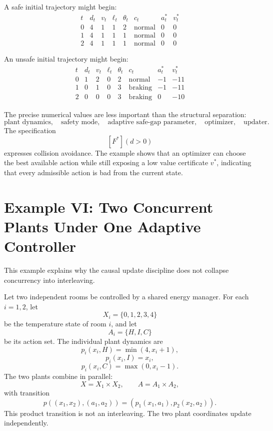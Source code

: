 A safe initial trajectory might begin:
\[
\begin{array}{c|c|c|c|c|c|c|c}
t & d_t & v_t & \ell_t & \theta_t & c_t & a_t^* & v_t^* \\
\hline
0 & 4 & 1 & 1 & 2 & \operatorname{normal} & 0 & 0 \\
1 & 4 & 1 & 1 & 1 & \operatorname{normal} & 0 & 0 \\
2 & 4 & 1 & 1 & 1 & \operatorname{normal} & 0 & 0
\end{array}
\]

An unsafe initial trajectory might begin:
\[
\begin{array}{c|c|c|c|c|c|c|c}
t & d_t & v_t & \ell_t & \theta_t & c_t & a_t^* & v_t^* \\
\hline
0 & 1 & 2 & 0 & 2 & \operatorname{normal} & -1 & -11 \\
1 & 0 & 1 & 0 & 3 & \operatorname{braking} & -1 & -11 \\
2 & 0 & 0 & 0 & 3 & \operatorname{braking} & 0 & -10
\end{array}
\]

The precise numerical values are less important than the structural separation:
\[
\text{plant dynamics},
\quad
\text{safety mode},
\quad
\text{adaptive safe-gap parameter},
\quad
\text{optimizer},
\quad
\text{updater}.
\]
The specification
\[
[F^*](d>0)
\]
expresses collision avoidance.  The example shows that an optimizer can choose the best available
action while still exposing a low value certificate \(v^*\), indicating that every admissible action
is bad from the current state.

\section{Example VI: Two Concurrent Plants Under One Adaptive Controller}
\label{sec:example-concurrent-plants}

This example explains why the causal update discipline does not collapse concurrency into
interleaving.

Let two independent rooms be controlled by a shared energy manager.  For each \(i=1,2\), let
\[
X_i=\{0,1,2,3,4\}
\]
be the temperature state of room \(i\), and let
\[
A_i=\{H,I,C\}
\]
be its action set.  The individual plant dynamics are
\[
p_i(x_i,H)=\min(4,x_i+1),
\]
\[
p_i(x_i,I)=x_i,
\]
\[
p_i(x_i,C)=\max(0,x_i-1).
\]
The two plants combine in parallel:
\[
X=X_1\times X_2,
\qquad
A=A_1\times A_2,
\]
with transition
\[
p((x_1,x_2),(a_1,a_2))
=
(p_1(x_1,a_1),p_2(x_2,a_2)).
\]
This product transition is not an interleaving.  The two plant coordinates update independently.

